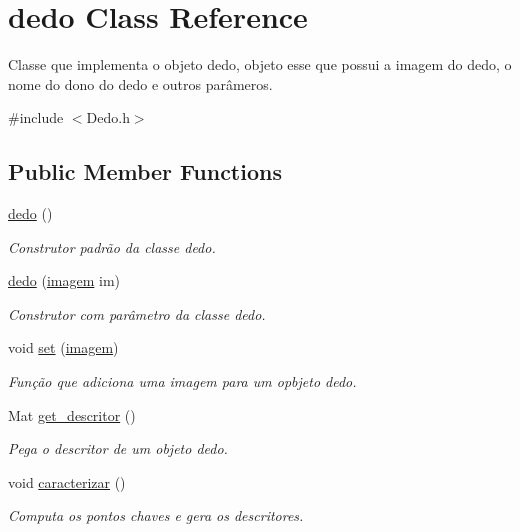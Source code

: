 \hypertarget{classdedo}{}\section{dedo Class Reference}
\label{classdedo}


Classe que implementa o objeto dedo, objeto esse que possui a imagem do dedo, o nome do dono do dedo e outros parâmeros.  




{\ttfamily \#include $<$Dedo.\+h$>$}

\subsection*{Public Member Functions}
\begin{DoxyCompactItemize}
\item 
\mbox{\hyperlink{classdedo_a7099ad8c3d3a2a21685c25c2ccc95765}{dedo}} ()
\begin{DoxyCompactList}\small\item\em Construtor padrão da classe dedo. \end{DoxyCompactList}\item 
\mbox{\hyperlink{classdedo_a07bf77eb028fadc8a1e84f56c9982b2d}{dedo}} (\mbox{\hyperlink{classimagem}{imagem}} im)
\begin{DoxyCompactList}\small\item\em Construtor com parâmetro da classe dedo. \end{DoxyCompactList}\item 
void \mbox{\hyperlink{classdedo_a6ef2d247e9e0710c9d55777cd5b5b929}{set}} (\mbox{\hyperlink{classimagem}{imagem}})
\begin{DoxyCompactList}\small\item\em Função que adiciona uma imagem para um opbjeto dedo. \end{DoxyCompactList}\item 
Mat \mbox{\hyperlink{classdedo_adc4d5e0f4d079cc9062cf1eb467d23b6}{get\+\_\+descritor}} ()
\begin{DoxyCompactList}\small\item\em Pega o descritor de um objeto dedo. \end{DoxyCompactList}\item 
void \mbox{\hyperlink{classdedo_a89112db7f0de9d4c3349b7766db45104}{caracterizar}} ()
\begin{DoxyCompactList}\small\item\em Computa os pontos chaves e gera os descritores. \end{DoxyCompactList}\item 

\end{DoxyCompactItemize}
